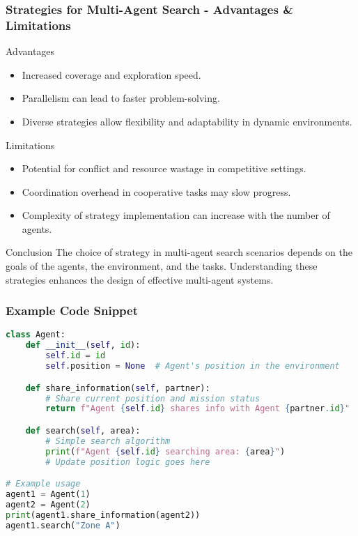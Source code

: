 \documentclass[aspectratio=169]{beamer}
\begin{document}
\begin{frame}[fragile]
    \frametitle{Strategies for Multi-Agent Search - Advantages & Limitations}
    \begin{block}{Advantages}
        \begin{itemize}
            \item Increased coverage and exploration speed.
            \item Parallelism can lead to faster problem-solving.
            \item Diverse strategies allow flexibility and adaptability in dynamic environments.
        \end{itemize}
    \end{block}
    
    \begin{block}{Limitations}
        \begin{itemize}
            \item Potential for conflict and resource wastage in competitive settings.
            \item Coordination overhead in cooperative tasks may slow progress.
            \item Complexity of strategy implementation can increase with the number of agents.
        \end{itemize}
    \end{block}
    
    \begin{block}{Conclusion}
        The choice of strategy in multi-agent search scenarios depends on the goals of the agents, the environment, and the tasks. Understanding these strategies enhances the design of effective multi-agent systems.
    \end{block}
\end{frame}

\begin{frame}[fragile]
    \frametitle{Example Code Snippet}
    \begin{lstlisting}[language=Python]
class Agent:
    def __init__(self, id):
        self.id = id
        self.position = None  # Agent's position in the environment

    def share_information(self, partner):
        # Share current position and mission status
        return f"Agent {self.id} shares info with Agent {partner.id}"

    def search(self, area):
        # Simple search algorithm
        print(f"Agent {self.id} searching area: {area}")
        # Update position logic goes here

# Example usage
agent1 = Agent(1)
agent2 = Agent(2)
print(agent1.share_information(agent2))
agent1.search("Zone A")
    \end{lstlisting}
\end{frame}
\end{document}
